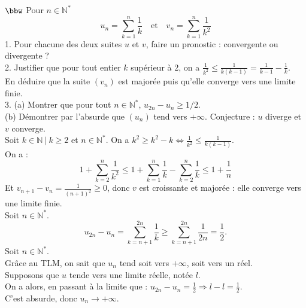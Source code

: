 \documentclass[11pt]{article}
\begin{document}
\begin{exercice}{$\bbw$}{}
    Pour $n\in\mathbb{N}^*$
    \begin{equation*}
        u_n = \sum_{k=1}^{n}\frac{1}{k} \quad \text{et} \quad v_n = \sum_{k=1}^{n}\frac{1}{k^2}
    \end{equation*}
    1. Pour chacune des deux suites $u$ et $v$, faire un pronostic : convergente ou divergente ?\\
    2. Justifier que pour tout entier $k$ supérieur à 2, on a $\frac{1}{k^2} \leq \frac{1}{k(k-1)} = \frac{1}{k-1} - \frac{1}{k}$.\\
    En déduire que la suite $(v_n)$ est majorée puis qu'elle converge vers une limite finie.\\
    3. (a) Montrer que pour tout $n\in\mathbb{N}^*$, $u_{2n} - u_n \geq 1/2$.\\
    (b) Démontrer par l'absurde que $(u_n)$ tend vers $+\infty$.
    \tcblower
     Conjecture : $u$ diverge et $v$ converge.\\
     Soit $k\in\mathbb{N} ~ | ~ k \geq 2$ et $n\in\mathbb{N}^*$. On a $k^2 \geq k^2 - k \iff \frac{1}{k^2} \leq \frac{1}{k(k-1)}$.\\
    On a :
    \begin{equation*}
        1 + \sum_{k=2}^{n}\frac{1}{k^2} \leq 1 + \sum_{k=1}^{n}\frac{1}{k} - \sum_{k=2}^n\frac{1}{k} \leq 1 + \frac{1}{n}
    \end{equation*}
    Et $v_{n+1} - v_n = \frac{1}{(n+1)^2} \geq 0$, donc $v$ est croissante et majorée : elle converge vers une limite finie.\\
     Soit $n\in\mathbb{N}^*$.
    \begin{equation*}
        u_{2n} - u_n = \sum_{k=n+1}^{2n}\frac{1}{k}\geq\sum_{k=n+1}^{2n}{\frac{1}{2n}}=\frac{1}{2}.
    \end{equation*}
     Soit $n\in\mathbb{N}^*$.\\
    Grâce au TLM, on sait que $u_n$ tend soit vers $+\infty$, soit vers un réel.\\
    Supposons que $u$ tende vers une limite réelle, notée $l$.\\
    On a alors, en passant à la limite que : $u_{2n} - u_n = \frac{1}{2} \Longrightarrow l-l = \frac{1}{2}$.\\
    C'est absurde, donc $u_n \longrightarrow +\infty$.
\end{exercice}
\end{document}
